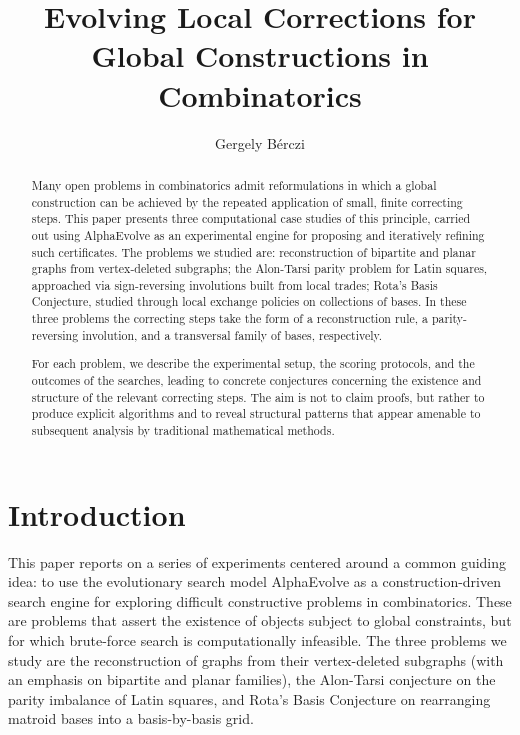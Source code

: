 \documentclass[11pt]{amsart}
\title{Evolving Local Corrections for Global Constructions in Combinatorics}
\author{Gergely B\'erczi}
\date{}
\begin{document}
\begin{abstract}
Many open problems in combinatorics admit reformulations in which a global construction can be achieved by the repeated application of small, finite correcting steps. This paper presents three computational case studies of this principle, carried out using AlphaEvolve as an experimental engine for proposing and iteratively refining such certificates. The problems we studied are: reconstruction of bipartite and planar graphs from vertex-deleted subgraphs; the Alon-Tarsi parity problem for Latin squares, approached via sign-reversing involutions built from local trades; Rota's Basis Conjecture, studied through local exchange policies on collections of bases. In these three problems the correcting steps take the form of a reconstruction rule, a parity-reversing involution, and a transversal family of bases, respectively.

For each problem, we describe the experimental setup, the scoring protocols, and the outcomes of the searches, leading to concrete conjectures concerning the existence and structure of the relevant correcting steps. The aim is not to claim proofs, but rather to produce explicit algorithms and to reveal structural patterns that appear amenable to subsequent analysis by traditional mathematical methods.
\end{abstract}


\maketitle


\section{Introduction}
\label{sec:introduction}

This paper reports on a series of experiments centered around a common guiding idea: to use the evolutionary search model AlphaEvolve \cite{DeepMindAlphaEvolve2025,AlphaEvolveArxiv} as a construction-driven search engine for exploring difficult constructive problems in combinatorics. These are problems that assert the existence of objects subject to global constraints, but for which brute-force search is computationally infeasible.
The three problems we study are the reconstruction of graphs from their vertex-deleted subgraphs (with an emphasis on bipartite and planar families), the Alon-Tarsi conjecture on the parity imbalance of Latin squares, and Rota's Basis Conjecture on rearranging matroid bases into a basis-by-basis grid. 
\end{document}
